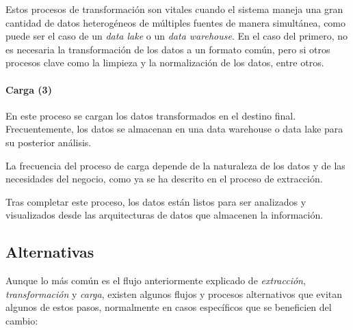 Estos procesos de transformación son vitales cuando el sistema maneja una gran cantidad de datos heterogéneos
de múltiples fuentes de manera simultánea, como puede ser el caso de un \textit{data lake} o un \textit{data
warehouse}. En el caso del primero, no es necesaria la transformación de los datos a un formato común, pero si
otros procesos clave como la limpieza y la normalización de los datos, entre otros.

\paragraph{Carga (3)}
En este proceso se cargan los datos transformados en el destino final. Frecuentemente, los datos se
almacenan en una data warehouse o data lake para su posterior análisis.

La frecuencia del proceso de carga depende de la naturaleza de los datos y de las necesidades del
negocio, como ya se ha descrito en el proceso de extracción.

Tras completar este proceso, los datos están listos para ser analizados y visualizados desde las arquitecturas
de datos que almacenen la información.

\newpage{}
\subsection{Alternativas}
Aunque lo más común es el flujo anteriormente explicado de \textit{extracción}, \textit{transformación} y
\textit{carga}, existen algunos flujos y procesos alternativos que evitan algunos de estos pasos, normalmente
en casos específicos que se beneficien del cambio:

